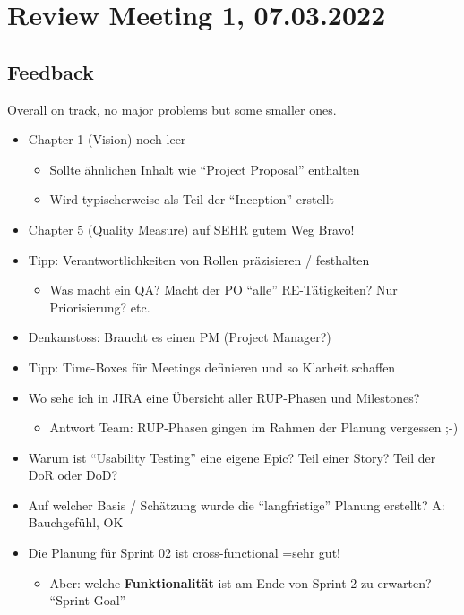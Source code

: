 \section{Review Meeting 1, 07.03.2022}

\subsection{Feedback}
Overall on track, no major problems but some smaller ones.

\begin{itemize}
    \item Chapter 1 (Vision) noch leer
    \begin{itemize}
        \item Sollte ähnlichen Inhalt wie ``Project Proposal'' enthalten
        \item Wird typischerweise als Teil der ``Inception'' erstellt
    \end{itemize}
    \item Chapter 5 (Quality Measure) auf SEHR gutem Weg \textrightarrow Bravo!
    \item Tipp: Verantwortlichkeiten von Rollen präzisieren / festhalten
    \begin{itemize}
        \item Was macht ein QA? Macht der PO ``alle'' RE-Tätigkeiten?
        Nur Priorisierung?
        etc.
    \end{itemize}
    \item Denkanstoss: Braucht es einen PM (Project Manager?)
    \item Tipp: Time-Boxes für Meetings definieren und so Klarheit schaffen
    \item Wo sehe ich in JIRA eine Übersicht aller RUP-Phasen und Milestones?
    \begin{itemize}
        \item Antwort Team: RUP-Phasen gingen im Rahmen der Planung vergessen ;-)
    \end{itemize}
    \item Warum ist ``Usability Testing'' eine eigene Epic?
    Teil einer Story?
    Teil der DoR oder DoD?
    \item Auf welcher Basis / Schätzung wurde die ``langfristige'' Planung erstellt? \textrightarrow A: Bauchgefühl, OK
    \item Die Planung für Sprint 02 ist cross-functional =\textrightarrow sehr gut!
    \begin{itemize}
        \item Aber: welche \textbf{Funktionalität} ist am Ende von Sprint 2 zu erwarten? \textrightarrow ``Sprint Goal''

\end{itemize}
\end{itemize}
